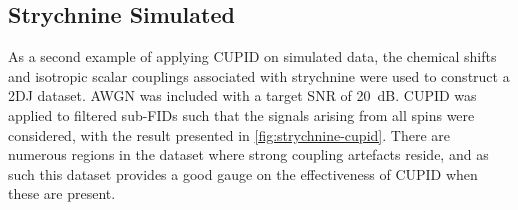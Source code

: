 
\subsection{Strychnine Simulated}
\label{subsec:strychnine-cupid}
As a second example of applying \ac{CUPID} on simulated data, the chemical
shifts and isotropic scalar couplings associated with strychnine
were used to construct a 2DJ dataset. \ac{AWGN} was included with a target
\ac{SNR} of \qty{20}{\deci\bel}. CUPID was applied to filtered
sub-FIDs such that the signals arising from all spins were considered, with the
result presented in \cref{fig:strychnine-cupid}. There are numerous
regions in the dataset where strong coupling artefacts reside, and as such this
dataset provides a good gauge on the effectiveness of \ac{CUPID} when these are
present.

